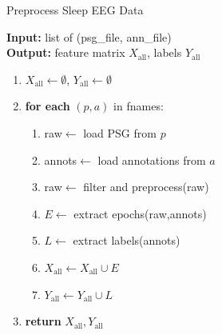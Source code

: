 \begin{algorithm}[H]
	\caption{Preprocess Sleep EEG Data}
	\label{alg:preprocess_data}
	\textbf{Input:} list of (psg\_file, ann\_file)\\
	\textbf{Output:} feature matrix $X_{\mathrm{all}}$, labels $Y_{\mathrm{all}}$
	\begin{enumerate}
		\item $X_{\mathrm{all}}\leftarrow\emptyset$, $Y_{\mathrm{all}}\leftarrow\emptyset$
		\item \textbf{for each} $(p,a)$ in fnames:
		\begin{enumerate}
			\item raw$\leftarrow$ load PSG from $p$
			\item annots$\leftarrow$ load annotations from $a$
			\item raw$\leftarrow$ filter and preprocess(raw)
			\item $E\leftarrow$ extract epochs(raw,annots)
			\item $L\leftarrow$ extract labels(annots)
			\item $X_{\mathrm{all}}\leftarrow X_{\mathrm{all}}\cup E$
			\item $Y_{\mathrm{all}}\leftarrow Y_{\mathrm{all}}\cup L$
		\end{enumerate}
		\item \textbf{return} $X_{\mathrm{all}},Y_{\mathrm{all}}$
	\end{enumerate}
\end{algorithm}

